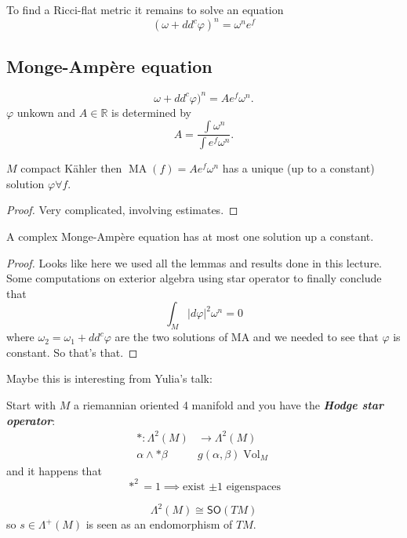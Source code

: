 \begin{upshot}\leavevmode
To find a Ricci-flat metric it remains to solve an equation
\[(\omega+ d d^c \varphi)^n=\omega^ne^f\]
\end{upshot}

\subsection{Monge-Ampère equation}

\begin{defn}\leavevmode
	\[\omega+d d^c \varphi)^n=Ae^f \omega^n.\]
	$\varphi$ unkown and $A \in \mathbb{R}$ is determined by
	\[A=\dfrac{\int \omega^n}{\int e^f \omega^n}.\]
\end{defn}

\begin{thm}\leavevmode
	$M$ compact Kähler then $\operatorname{MA}(f)=A e^f\omega^n$ has a unique (up to a constant) solution $\varphi\forall f.$
\end{thm}

\begin{proof}\leavevmode
Very complicated, involving estimates.
\end{proof}

\begin{prop}[Calabi]\leavevmode
	A complex Monge-Ampère equation has at most one solution up a constant.
\end{prop}

\begin{proof}\leavevmode
Looks like here we used all the lemmas and results done in this lecture. Some computations on exterior algebra using star operator to finally conclude that
 \[\int_{M}|d\varphi|^2\omega^n=0\]
 where $\omega_2=\omega_1+ d d^c \varphi$ are the two solutions of MA and we needed to see that $\varphi$ is constant. So that's that.
\end{proof}

Maybe this is interesting from Yulia's talk:

{\color{3}

Start with $M$ a riemannian oriented 4 manifold  and you have the \textit{\textbf{Hodge star operator}}:
\begin{align*}
	*: \Lambda^{2}(M) &\longrightarrow \Lambda^{2}(M) \\
	\alpha\wedge *\beta &g(\alpha,\beta)\operatorname{Vol}_M
\end{align*}
and it happens that
 \[*^2=1\implies \text{exist $\pm 1$ eigenspaces} \]

 \begin{remark}\leavevmode
 	\[\Lambda^{2}(M)\cong \mathsf{SO}(TM)\]
so $s\in\Lambda^{+}(M)$ is seen as an endomorphism of $TM$.
\end{remark}}




